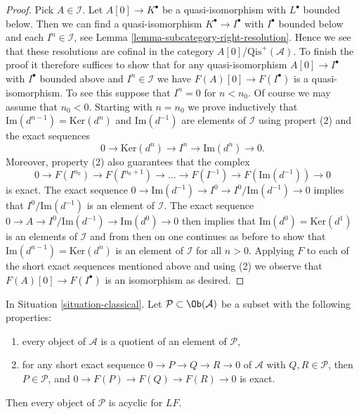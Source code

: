 \begin{proof}
Pick $A \in \mathcal{I}$.
Let $A[0] \to K^\bullet$ be a quasi-isomorphism with $L^\bullet$
bounded below. Then we can find a quasi-isomorphism
$K^\bullet \to I^\bullet$ with $I^\bullet$ bounded below and
each $I^n \in \mathcal{I}$, see
Lemma \ref{lemma-subcategory-right-resolution}.
Hence we see that these resolutions are cofinal in the category
$A[0]/\text{Qis}^{+}(\mathcal{A})$. To finish the proof it therefore
suffices to show that for any quasi-isomorphism
$A[0] \to I^\bullet$ with $I^\bullet$ bounded above and $I^n \in \mathcal{I}$
we have $F(A)[0] \to F(I^\bullet)$ is a quasi-isomorphism.
To see this suppose that $I^n = 0$ for $n < n_0$. Of course we may assume
that $n_0 < 0$. Starting with $n = n_0$ we prove inductively that
$\text{Im}(d^{n - 1}) = \text{Ker}(d^n)$ and $\text{Im}(d^{-1})$
are elements of $\mathcal{I}$ using propert (2) and the exact sequences
$$
0 \to \text{Ker}(d^n) \to I^n \to \text{Im}(d^n) \to 0.
$$
Moreover, property (2) also guarantees that the complex
$$
0 \to F(I^{n_0}) \to F(I^{n_0 + 1}) \to \ldots \to F(I^{-1}) \to
F(\text{Im}(d^{-1})) \to 0
$$
is exact. The exact sequence
$0 \to \text{Im}(d^{-1}) \to I^0 \to I^0/\text{Im}(d^{-1}) \to 0$
implies that $I^0/\text{Im}(d^{-1})$ is an element of $\mathcal{I}$.
The exact sequence $0 \to A \to I^0/\text{Im}(d^{-1}) \to \text{Im}(d^0) \to 0$
then implies that $\text{Im}(d^0) = \text{Ker}(d^1)$ is an elements of
$\mathcal{I}$ and from then on one continues as before to show that
$\text{Im}(d^{n - 1}) = \text{Ker}(d^n)$ is an element of $\mathcal{I}$
for all $n > 0$. Applying $F$ to each of the short exact sequences
mentioned above and using (2) we observe that $F(A)[0] \to F(I^\bullet)$
is an isomorphism as desired.
\end{proof}

\begin{lemma}
\label{lemma-subcategory-left-acyclics}
In
Situation \ref{situation-classical}.
Let $\mathcal{P} \subset \Ob(\mathcal{A})$ be a subset with the
following properties:
\begin{enumerate}
\item every object of $\mathcal{A}$ is a quotient of an element of
$\mathcal{P}$,
\item for any short exact sequence $0 \to P \to Q \to R \to 0$ of
$\mathcal{A}$ with $Q, R \in \mathcal{P}$, then $P \in \mathcal{P}$,
and $0 \to F(P) \to F(Q) \to F(R) \to 0$ is exact.
\end{enumerate}
Then every object of $\mathcal{P}$ is acyclic for $LF$.
\end{lemma}

